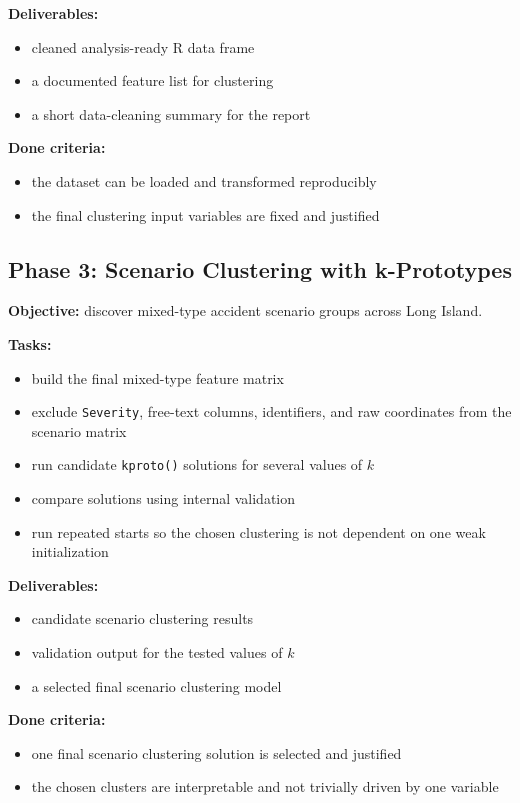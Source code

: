 \documentclass[11pt]{article}
\begin{document}
\textbf{Deliverables:}
\begin{itemize}
\item cleaned analysis-ready R data frame
\item a documented feature list for clustering
\item a short data-cleaning summary for the report
\end{itemize}

\textbf{Done criteria:}
\begin{itemize}
\item the dataset can be loaded and transformed reproducibly
\item the final clustering input variables are fixed and justified
\end{itemize}

\subsection{Phase 3: Scenario Clustering with k-Prototypes}

\textbf{Objective:} discover mixed-type accident scenario groups across Long Island.

\textbf{Tasks:}
\begin{itemize}
\item build the final mixed-type feature matrix
\item exclude \texttt{Severity}, free-text columns, identifiers, and raw coordinates from the scenario matrix
\item run candidate \texttt{kproto()} solutions for several values of $k$
\item compare solutions using internal validation
\item run repeated starts so the chosen clustering is not dependent on one weak initialization
\end{itemize}

\textbf{Deliverables:}
\begin{itemize}
\item candidate scenario clustering results
\item validation output for the tested values of $k$
\item a selected final scenario clustering model
\end{itemize}

\textbf{Done criteria:}
\begin{itemize}
\item one final scenario clustering solution is selected and justified
\item the chosen clusters are interpretable and not trivially driven by one variable
\end{itemize}
\end{document}
